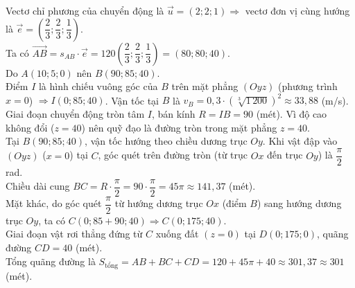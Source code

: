 \begin{ex}
{\begin{itemchoice}
			\itemch
			Vectơ chỉ phương của chuyển động là $\overrightarrow{u}=(2; 2; 1)\Rightarrow$ vectơ đơn vị cùng hướng là $\overrightarrow{e}=\left(\dfrac{2}{3};\dfrac{2}{3};\dfrac{1}{3}\right)$.\\
			Ta có $\overrightarrow{AB}=s_{AB}\cdot\overrightarrow{e}=120\left(\dfrac{2}{3};\dfrac{2}{3};\dfrac{1}{3}\right)=(80; 80; 40)$.\\
			Do $A(10; 5; 0)$ nên $B(90; 85; 40)$.\\
			Điểm $I$ là hình chiếu vuông góc của $B$ trên mặt phẳng $(Oyz)$ (phương trình $x=0$) $\Rightarrow I(0; 85; 40)$.
			\itemch
			Vận tốc tại $B$ là $v_B=0{,}3\cdot\left(\sqrt[3]{1\,200}\right)^2\approx 33{,}88$ (m/s).\\
			Giai đoạn chuyển động tròn tâm $I$, bán kính $R=IB=90$ (mét). Vì độ cao không đổi ($z=40$) nên quỹ đạo là đường tròn trong mặt phẳng $z=40$.\\
			Tại $B(90; 85; 40)$, vận tốc hướng theo chiều dương trục $Oy$. Khi vật đập vào $(Oyz)$ ($x=0$) tại $C$, góc quét trên đường tròn (từ trục $Ox$ đến trục $Oy$) là $\dfrac{\pi}{2}$ rad.\\
			Chiều dài cung $BC=R\cdot\dfrac{\pi}{2}=90\cdot\dfrac{\pi}{2}=45\pi\approx 141{,}37$ (mét).\\
			Mặt khác, do góc quét $\dfrac{\pi}{2}$ từ hướng dương trục $Ox$ (điểm $B$) sang hướng dương trục $Oy$, ta có $C(0;85+90;40)\Rightarrow C(0;175;40)$.\\
			Giai đoạn vật rơi thẳng đứng từ $C$ xuống đất $(z=0)$ tại $D(0;175;0)$, quãng đường $CD=40$ (mét).\\
			Tổng quãng đường là $S_\text{tổng}=AB+BC+CD=120+45\pi+40\approx 301{,}37\approx 301$ (mét).
\end{itemchoice}}
\end{ex}
